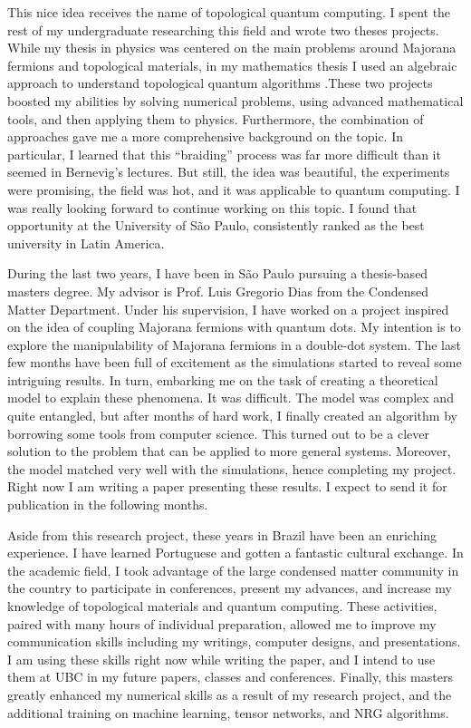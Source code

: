 \documentclass[12pt,a4paper,sans]{moderncv}        %
\begin{document}
This nice idea receives the name of topological quantum computing. I spent the rest of my undergraduate researching this field and wrote two theses projects. While my thesis in physics was centered on the main problems around Majorana fermions and topological materials, in my mathematics thesis I used an algebraic approach to understand topological quantum algorithms .These two projects boosted my abilities by solving numerical problems, using advanced mathematical tools, and then applying them to physics. Furthermore, the combination of approaches gave me a more comprehensive background on the topic. In particular, I learned that this “braiding” process was far more difficult than it seemed in Bernevig's lectures. But still, the idea was beautiful, the experiments were promising, the field was hot, and it was applicable to quantum computing. I was really looking forward to continue working on this topic. I found that opportunity at the University of São Paulo, consistently ranked as the best university in Latin America. 

During the last two years, I have been in São Paulo pursuing a thesis-based masters degree.  My advisor is Prof. Luis Gregorio Dias from the Condensed Matter Department. Under his supervision, I have worked on a project inspired on the idea of coupling Majorana fermions with quantum dots. My intention is to explore the manipulability of Majorana fermions in a double-dot system. The last few months have been full of excitement as the simulations started to reveal some intriguing results. In turn, embarking me on the task of creating a theoretical model to explain these phenomena. It was difficult. The model was complex and quite entangled, but after months of hard work, I finally created an algorithm by borrowing some tools from computer science. This turned out to be a clever solution to the problem that can be applied to more general systems. Moreover, the model matched very well with the simulations, hence completing my project. Right now I am writing a paper presenting these results. I expect to send it for publication in the following months. 

Aside from this research project, these years in Brazil have been an enriching experience. I have learned Portuguese and gotten a fantastic cultural exchange. In the academic field, I took advantage of the large condensed matter community in the country to participate in conferences, present my advances, and increase my knowledge of topological materials and quantum computing. These activities, paired with many hours of individual preparation, allowed me to improve my communication skills including my writings, computer designs, and presentations. I am using these skills right now while writing the paper, and I intend to use them at UBC in my future papers, classes and conferences. Finally, this masters greatly enhanced my numerical skills as a result of my research project, and the additional training on machine learning, tensor networks, and NRG algorithms. 
\end{document}
